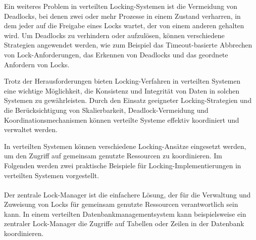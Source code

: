 Ein weiteres Problem in verteilten Locking-Systemen ist die Vermeidung von Deadlocks, bei denen zwei oder mehr Prozesse in einem Zustand verharren, in dem jeder auf die Freigabe eines Locks wartet, der von einem anderen gehalten wird. Um Deadlocks zu verhindern oder aufzulösen, können verschiedene Strategien angewendet werden, wie zum Beispiel das Timeout-basierte Abbrechen von Lock-Anforderungen, das Erkennen von Deadlocks und das geordnete Anfordern von Locks.

Trotz der Herausforderungen bieten Locking-Verfahren in verteilten Systemen eine wichtige Möglichkeit, die Konsistenz und Integrität von Daten in solchen Systemen zu gewährleisten. Durch den Einsatz geeigneter Locking-Strategien und die Berücksichtigung von Skalierbarkeit, Deadlock-Vermeidung und Koordinationsmechanismen können verteilte Systeme effektiv koordiniert und verwaltet werden.

In verteilten Systemen können verschiedene Locking-Ansätze eingesetzt werden, um den Zugriff auf gemeinsam genutzte Ressourcen zu koordinieren. Im Folgenden werden zwei praktische Beispiele für Locking-Implementierungen in verteilten Systemen vorgestellt.
\\\\
Der zentrale Lock-Manager ist die einfachere Lösung, der für die Verwaltung und Zuweisung von Locks für gemeinsam genutzte Ressourcen verantwortlich sein kann. In einem verteilten Datenbankmanagementsystem kann beispielsweise ein zentraler Lock-Manager die Zugriffe auf Tabellen oder Zeilen in der Datenbank koordinieren.

